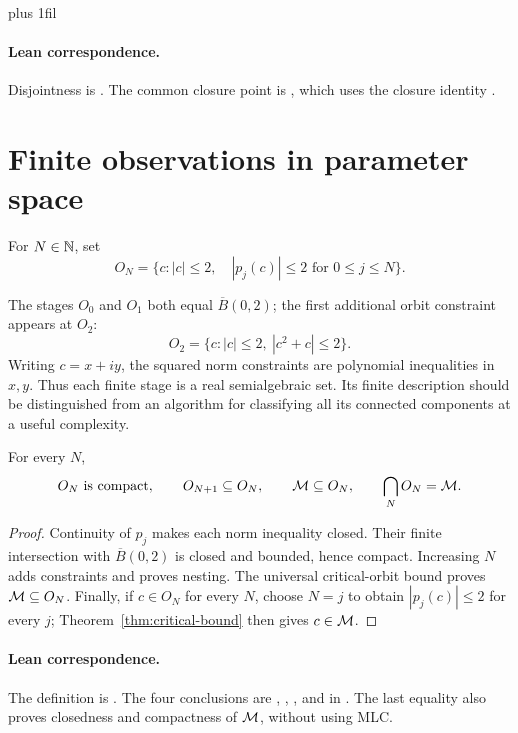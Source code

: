 {\rightskip=0pt plus 1fil
\paragraph{Lean correspondence.}
Disjointness is
.
The common closure point is
,
which uses the closure identity
.\par}

\section{Finite observations in parameter space}

\begin{definition}
\label{def:finite-outer}
For $N\in\mathbb N$, set
\[
 O_N=\{c:|c|\le2,\quad |p_j(c)|\le2\text{ for }0\le j\le N\}.
\]
\end{definition}

The stages $O_0$ and $O_1$ both equal $\overline B(0,2)$; the first
additional orbit constraint appears at $O_2$:
\[
 O_2=\{c:|c|\le2,\ |c^2+c|\le2\}.
\]
Writing $c=x+iy$, the squared norm constraints are polynomial
inequalities in $x,y$.  Thus each finite stage is a real semialgebraic
set.  Its finite description should be distinguished from an algorithm
for classifying all its connected components at a useful complexity.

\begin{theorem}
\label{thm:finite-outer}
For every $N$,
\[
 O_N\text{ is compact},\qquad
 O_{N+1}\subseteq O_N,\qquad
 \mathcal M\subseteq O_N,\qquad
 \bigcap_N O_N=\mathcal M.
\]
\end{theorem}

\begin{proof}
Continuity of $p_j$ makes each norm inequality closed.  Their finite
intersection with $\overline B(0,2)$ is closed and bounded, hence
compact.  Increasing $N$ adds constraints and proves nesting.
The universal critical-orbit bound proves $\mathcal M\subseteq O_N$.
Finally, if $c\in O_N$ for every $N$, choose $N=j$ to obtain
$|p_j(c)|\le2$ for every $j$; Theorem~\ref{thm:critical-bound} then
gives $c\in\mathcal M$.
\end{proof}

\paragraph{Lean correspondence.}
The definition is
.
The four conclusions are
,
,
, and
 in
.
The last equality also proves closedness and compactness of $\mathcal M$,
without using MLC.

